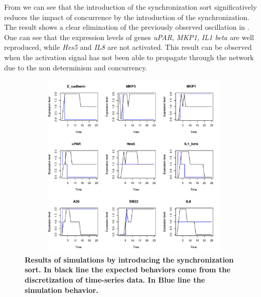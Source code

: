 From  we can see that the introduction of the synchronization sort significatively reduces the 
impact of concurrence by the introduction of the synchronization. The result shows  a 
clear elimination of the previously observed oscillation in . One can see that the expression levels of genes \emph{uPAR}, \emph{MKP1},
\emph{IL1 beta} are well reproduced, while \emph{Hes5} and \emph{IL8} are not activated. This result can be observed when the activation
signal has not been able to propagate through the network due to the non determinism  and concurrency.


\begin{figure}[!t]
\centering
\includegraphics[width=6.5in,height=3.5in]{images/resultWS.pdf}
\caption{\bf Results of simulations by introducing the synchronization sort. In black line the expected behaviors
come from the discretization of time-series data. In Blue line the simulation behavior.}
\label{fig:rws}
\end{figure}



%
%

